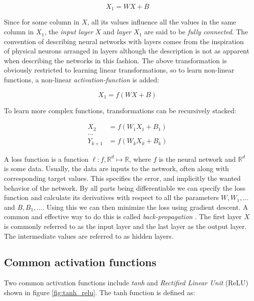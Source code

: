 \begin{equation}
    X_1 = WX + B
\end{equation}

Since for some column in $X$, all its values influence all the values in the
same column in $X_1$, the \textit{input layer} $X$ and \textit{layer} $X_1$ are
said to be \textit{fully connected}. The convention of describing neural
networks with layers comes from the inspiration of physical neurons arranged in
layers although the description is not as apparent when describing the networks
in this fashion. The above transformation is obviously restricted to learning
linear transformations, so to learn non-linear functions, a
non-linear \textit{activation-function} is added:

\begin{equation}
    X_1 = f(WX + B)
\end{equation}

To learn more complex functions, transformations can be recursively stacked:

\begin{align}
    X_2 &= f(W_1X_1 + B_1)\\
    ...\\
    Y_{k+1} &= f(W_kX_k + B_k)
\end{align}

A loss function is a function $\ell : f, \mathbb{R}^d \longmapsto \mathbb{R}$,
where $f$ is the neural network and $\mathbb{R}^d$ is some data. Usually, the
data are inputs to the network, often along with corresponding target values.
This specifies the error, and implicitly the wanted behavior of the network. By
all parts being differentiable we can specify the loss function and calculate
its derivatives with respect to all the parameters $W, W_1,...$ and $B, B_1,
...$.  Using this we can then minimize the loss using gradient descent. A
common and effective way to do this is called \textit{back-propagation}
\cite{williams1986learning}.  The first layer $X$ is commonly referred to as
the input layer and the last layer as the output layer. The intermediate values are
referred to as hidden layers.

\subsection{Common activation functions}

Two common activation functions include \textit{tanh} and \textit{Rectified
Linear Unit} (ReLU) \cite{jarrett2009best} shown in figure \ref{fig:tanh_relu}. The tanh function is defined as:

